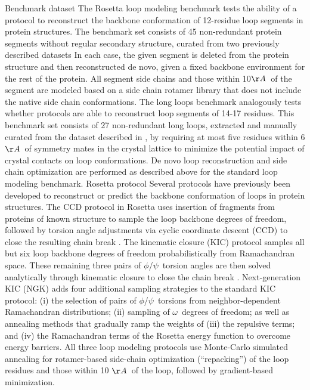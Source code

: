 Benchmark dataset
The Rosetta loop modeling benchmark \cite{mandell_sub-angstrom_2009,tonikian_specificity_2008,ernst_rapid_2009,smith_predicting_2011,smith_structure-based_2010,stein_improvements_2013} tests the ability of a protocol to reconstruct the backbone conformation of 12-residue loop segments in protein structures. The benchmark set consists of 45 non-redundant protein segments without regular secondary structure, curated from two previously described datasets \cite{sellers_toward_2008,wang_proteinprotein_2007,fiser_modeling_2000,rohl_modeling_2004,zhu_long_2006,jacobson_hierarchical_2004}
In each case, the given segment is deleted from the protein structure and then reconstructed de novo, given a fixed backbone environment for the rest of the protein. All segment side chains and those within 10$\AA$\ of the segment are modeled based on a side chain rotamer library \cite{shapovalov_smoothed_2011} that does not include the native side chain conformations.
The long loops benchmark \cite{stein_improvements_2013} analogously tests whether protocols are able to reconstruct loop segments of 14-17 residues. This benchmark set consists of 27 non-redundant long loops, extracted and manually curated from the dataset described in \cite{zhao_progress_2011}, by requiring at most five residues within 6$\AA$\ of symmetry mates in the crystal lattice to minimize the potential impact of crystal contacts on loop conformations. De novo loop reconstruction and side chain optimization are performed as described above for the standard loop modeling benchmark.
Rosetta protocol
Several protocols have previously been developed to reconstruct or predict the backbone conformation of loops in protein structures. The CCD protocol in Rosetta \cite{wang_proteinprotein_2007} uses insertion of fragments from proteins of known structure to sample the loop backbone degrees of freedom, followed by torsion angle adjustments via cyclic coordinate descent (CCD) to close the resulting chain break \cite{canutescu_cyclic_2003}. The kinematic closure (KIC) protocol \cite{mandell_sub-angstrom_2009} samples all but six loop backbone degrees of freedom probabilistically from Ramachandran space. These remaining three pairs of $\phi$/$\psi$\ torsion angles are then solved analytically through kinematic closure to close the chain break \cite{coutsias_kinematic_2004}. Next-generation KIC (NGK) \cite{stein_improvements_2013} adds four additional sampling strategies to the standard KIC protocol: (i) the selection of pairs of $\phi$/$\psi$\ torsions from neighbor-dependent Ramachandran distributions; (ii) sampling of $\omega$\ degrees of freedom; as well as annealing methods that gradually ramp the weights of (iii) the repulsive terms; and (iv) the Ramachandran terms of the Rosetta energy function to overcome energy barriers. All three loop modeling protocols use Monte-Carlo simulated annealing for rotamer-based side-chain optimization (“repacking”) of the loop residues and those within 10 $\AA$\ of the loop, followed by gradient-based minimization.
